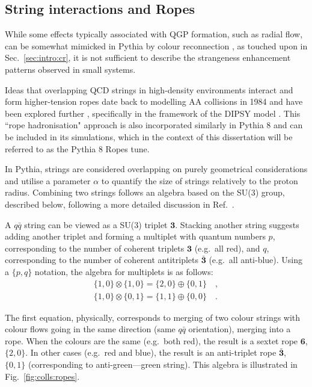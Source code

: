 \subsection{String interactions and Ropes}

While some effects typically associated with QGP formation, such as radial flow, can be somewhat mimicked in Pythia by colour reconnection \cite{bierlichEffectsColourReconnection2015, ortizColorReconnectionFlowlike2013}, as touched upon in Sec.~\ref{sec:intro:cr}, it is not sufficient to describe the strangeness enhancement patterns observed in small systems.

Ideas that overlapping QCD strings in high-density environments interact and form higher-tension ropes date back to modelling AA collisions in 1984 \cite{biroColourRopeModel1984} and have been explored further \cite{sorgeColourRopeFormation1992}, specifically in the framework of the DIPSY model \cite{bierlichEffectsOverlappingStrings2015}. This ``rope hadronisation" approach is also incorporated similarly in Pythia 8 and can be included in its simulations, which in the context of this dissertation will be referred to as the Pythia 8 Ropes tune.

In Pythia, strings are considered overlapping on purely geometrical considerations and utilise a parameter $\alpha$ to quantify the size of strings relatively to the proton radius. Combining two strings follows an algebra based on the SU($3$) group, described below, following a more detailed discussion in Ref.~\cite{bierlichEffectsOverlappingStrings2015}.

A $q\bar{q}$ string can be viewed as a SU($3$) triplet $\mathbf{3}$. Stacking another string suggests adding another triplet and forming a multiplet with quantum numbers $p$, corresponding to the number of coherent triplets $\mathbf{3}$ (e.g.\ all red), and $q$, corresponding to the number of coherent antitriplets $\mathbf{\bar{3}}$ (e.g.\ all anti-blue). Using a $\{p,q\}$ notation, the algebra for multiplets is as follows:
\begin{align}
\{1,0\} \otimes \{1,0\} = \{2,0\} \oplus \{0,1\} \quad ,\\
\{1,0\} \otimes \{0,1\} = \{1,1\} \oplus \{0,0\} \quad .
\end{align}

The first equation, physically, corresponds to merging of two colour strings with colour flows going in the same direction (same $q\bar{q}$ orientation), merging into a rope. When the colours are the same (e.g.\ both red), the result is a sextet rope $\mathbf{6}$, $\{2,0\}$. In other cases (e.g.\ red and blue), the result is an anti-triplet rope $\mathbf{\bar{3}}$, $\{0,1\}$ (corresponding to anti-green---green string). This algebra is illustrated in Fig.~\ref{fig:colls:ropes}.

